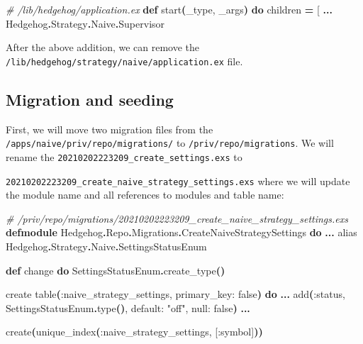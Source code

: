 \documentclass[
  oneside]{book}
\newenvironment{Shaded}{\begin{snugshade}}{\end{snugshade}}
\newcommand{\CommentTok}[1]{\textcolor[rgb]{0.56,0.35,0.01}{\textit{#1}}}
\newcommand{\ConstantTok}[1]{\textcolor[rgb]{0.56,0.35,0.01}{#1}}
\newcommand{\FunctionTok}[1]{\textcolor[rgb]{0.13,0.29,0.53}{\textbf{#1}}}
\newcommand{\ImportTok}[1]{#1}
\newcommand{\KeywordTok}[1]{\textcolor[rgb]{0.13,0.29,0.53}{\textbf{#1}}}
\newcommand{\NormalTok}[1]{#1}
\newcommand{\OperatorTok}[1]{\textcolor[rgb]{0.81,0.36,0.00}{\textbf{#1}}}
\newcommand{\OtherTok}[1]{\textcolor[rgb]{0.56,0.35,0.01}{#1}}
\newcommand{\StringTok}[1]{\textcolor[rgb]{0.31,0.60,0.02}{#1}}
\newcommand{\VariableTok}[1]{\textcolor[rgb]{0.00,0.00,0.00}{#1}}
\begin{document}
\begin{Shaded}
\begin{Highlighting}[]
\CommentTok{\# /lib/hedgehog/application.ex}
  \KeywordTok{def}\NormalTok{ start}\FunctionTok{(}\NormalTok{\_type, \_args}\FunctionTok{)} \KeywordTok{do}
\NormalTok{    children }\OperatorTok{=} \OtherTok{[}
      \OperatorTok{...}
      \ConstantTok{Hedgehog}\OperatorTok{.}\ConstantTok{Strategy}\OperatorTok{.}\ConstantTok{Naive}\OperatorTok{.}\ConstantTok{Supervisor}
\end{Highlighting}
\end{Shaded}

After the above addition, we can remove the \texttt{/lib/hedgehog/strategy/naive/application.ex} file.

\subsection{Migration and seeding}\label{migration-and-seeding}

First, we will move two migration files from the \texttt{/apps/naive/priv/repo/migrations/} to \texttt{/priv/repo/migrations}. We will rename the \texttt{20210202223209\_create\_settings.exs} to

\texttt{20210202223209\_create\_naive\_strategy\_settings.exs} where we will update the module name and all references to modules and table name:

\begin{Shaded}
\begin{Highlighting}[]
\CommentTok{\# /priv/repo/migrations/20210202223209\_create\_naive\_strategy\_settings.exs}
\KeywordTok{defmodule} \ConstantTok{Hedgehog}\OperatorTok{.}\ConstantTok{Repo}\OperatorTok{.}\ConstantTok{Migrations}\OperatorTok{.}\ConstantTok{CreateNaiveStrategySettings} \KeywordTok{do}
  \OperatorTok{...}
  \ImportTok{alias} \ConstantTok{Hedgehog}\OperatorTok{.}\ConstantTok{Strategy}\OperatorTok{.}\ConstantTok{Naive}\OperatorTok{.}\ConstantTok{SettingsStatusEnum}

  \KeywordTok{def}\NormalTok{ change }\KeywordTok{do}
    \ConstantTok{SettingsStatusEnum}\OperatorTok{.}\NormalTok{create\_type}\FunctionTok{()}

\NormalTok{    create table}\FunctionTok{(}\VariableTok{:naive\_strategy\_settings}\NormalTok{, }\VariableTok{primary\_key:} \ConstantTok{false}\FunctionTok{)} \KeywordTok{do}
      \OperatorTok{...}
\NormalTok{      add}\FunctionTok{(}\VariableTok{:status}\NormalTok{, }\ConstantTok{SettingsStatusEnum}\OperatorTok{.}\NormalTok{type}\FunctionTok{()}\NormalTok{, }\VariableTok{default:} \StringTok{"off"}\NormalTok{, }\VariableTok{null:} \ConstantTok{false}\FunctionTok{)}
    \OperatorTok{...}

\NormalTok{    create}\FunctionTok{(}\NormalTok{unique\_index}\FunctionTok{(}\VariableTok{:naive\_strategy\_settings}\NormalTok{, }\OtherTok{[}\VariableTok{:symbol}\OtherTok{]}\FunctionTok{))}
\end{Highlighting}
\end{Shaded}
\end{document}
